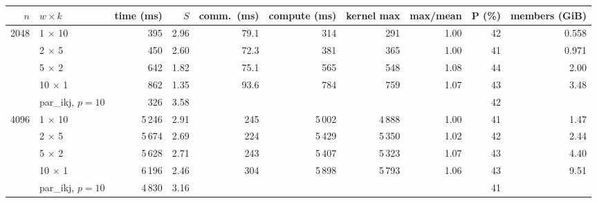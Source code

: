 \begin{tabular}{rlrrrrrrrr}
\toprule
$n$ & $w \times k$ & time (ms) & $S$ & comm.\ (ms) & compute (ms) & kernel max & max/mean & P (\%) & members (GiB) \\
\midrule
2048 & 1 $\times$ 10 & 395 & 2.96 & 79.1 & 314 & 291 & 1.00 & 42 & 0.558 \\
 & 2 $\times$ 5 & 450 & 2.60 & 72.3 & 381 & 365 & 1.00 & 41 & 0.971 \\
 & 5 $\times$ 2 & 642 & 1.82 & 75.1 & 565 & 548 & 1.08 & 44 & 2.00 \\
 & 10 $\times$ 1 & 862 & 1.35 & 93.6 & 784 & 759 & 1.07 & 43 & 3.48 \\
 & par\_ikj, $p=10$ & 326 & 3.58 &  &  &  &  & 42 &  \\
\midrule
4096 & 1 $\times$ 10 & 5\,246 & 2.91 & 245 & 5\,002 & 4\,888 & 1.00 & 41 & 1.47 \\
 & 2 $\times$ 5 & 5\,674 & 2.69 & 224 & 5\,429 & 5\,350 & 1.02 & 42 & 2.44 \\
 & 5 $\times$ 2 & 5\,628 & 2.71 & 243 & 5\,407 & 5\,323 & 1.07 & 43 & 4.40 \\
 & 10 $\times$ 1 & 6\,196 & 2.46 & 304 & 5\,898 & 5\,793 & 1.06 & 43 & 9.51 \\
 & par\_ikj, $p=10$ & 4\,830 & 3.16 &  &  &  &  & 41 &  \\
\bottomrule
\end{tabular}
\par{}
